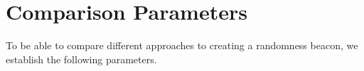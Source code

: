 \section{Comparison Parameters}
\label{sub:comparison_parameters}
To be able to compare different approaches to creating a randomness beacon, we establish the following parameters.
%
%
%
